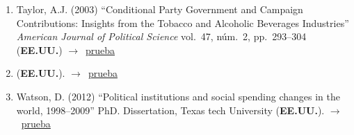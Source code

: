 \documentclass[12 pt, letter]{article}
\newenvironment{CitasMiTrabajo}{
    \begin{footnotesize}
    \begin{enumerate}[label={\footnotesize\emph{cita~\arabic*}},ref=\arabic*] %
        \setlength{\itemsep}{.1\itemsep}
        \setlength{\parskip}{.1\parskip}
    }{\end{enumerate}\end{footnotesize}}
\begin{document}
\begin{CitasMiTrabajo}
        \item Taylor, A.J. (2003)
        ``Conditional Party Government and Campaign Contributions: Insights
        from the Tobacco and Alcoholic Beverages Industries'' \emph{American
        Journal of Political Science} vol.\ 47, n\'um.\ 2, pp.\ 293--304  (\textbf{EE.UU.}) $\rightarrow$~\href{https://github.com/emagar/cv/blob/master/citasMiTrab/coxMagar/taylor.pdf}{prueba}

       \item {} (\textbf{EE.UU.}).  $\rightarrow$~\href{https://books.google.com.mx/books?hl=en&lr=&id=vmqmAUD4AgIC&oi=fnd&pg=PR7&ots=HueO0z-1yB&sig=ZS0CTD_I98KYLi76fysLqDJz9qs&redir_esc=y#v=onepage&q=magar&f=false}{prueba}

        \item Watson, D. (2012) ``Political institutions and social spending changes in the world, 1998--2009'' PhD. Dissertation, Texas tech University (\textbf{EE.UU.}). $\rightarrow$~\href{https://github.com/emagar/cv/blob/master/citasMiTrab/coxMagar/watson2012.pdf}{prueba}
        
        \label{ncites:cox.magar.1999} %


\end{CitasMiTrabajo}
\end{document}
